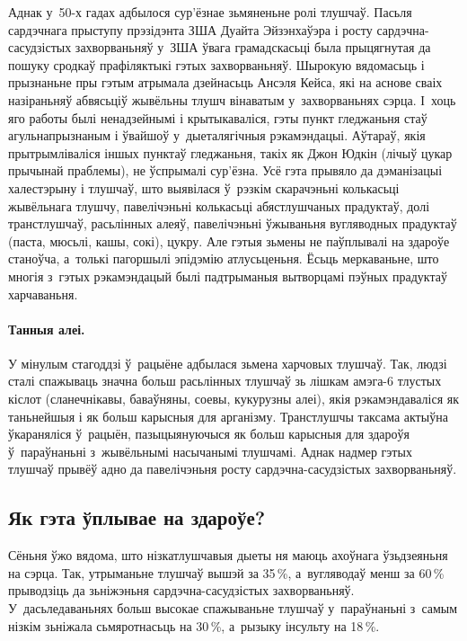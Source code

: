 Аднак у~50-х гадах адбылося сур'ёзнае зьмяненьне ролі тлушчаў. Пасьля сардэчнага прыступу прэзідэнта ЗША Дуайта Эйзэнхаўэра і росту сардэчна-сасудзістых захворваньняў у~ЗША ўвага грамадскасьці была прыцягнутая да пошуку сродкаў прафіляктыкі гэтых захворваньняў. Шырокую вядомасьць і прызнаньне пры гэтым атрымала дзейнасьць Ансэля Кейса, які на аснове сваіх назіраньняў абвясьціў жывёльны тлушч вінаватым у~захворваньнях сэрца. І~хоць яго работы былі ненадзейнымі і крытыкаваліся, гэты пункт гледжаньня стаў агульнапрызнаным і ўвайшоў у~дыеталягічныя рэкамэндацыі. Аўтараў, якія прытрымліваліся іншых пунктаў гледжаньня, такіх як Джон Юдкін (лічыў цукар прычынай праблемы), не ўспрымалі сур'ёзна. Усё гэта прывяло да дэманізацыі халестэрыну і тлушчаў, што выявілася ў~рэзкім скарачэньні колькасьці жывёльнага тлушчу, павелічэньні колькасьці абястлушчаных прадуктаў, долі транстлушчаў, расьлінных алеяў, павелічэньні ўжываньня вугляводных прадуктаў (паста, мюсьлі, кашы, сокі), цукру. Але гэтыя зьмены не паўплывалі на здароўе станоўча, а~толькі пагоршылі эпідэмію атлусьценьня. Ёсьць меркаваньне, што многія з~гэтых рэкамэндацый былі падтрыманыя вытворцамі пэўных прадуктаў харчаваньня.


\paragraph{Танныя алеі.}
У мінулым стагоддзі ў~рацыёне адбылася зьмена харчовых тлушчаў. Так, людзі сталі спажываць значна больш расьлінных тлушчаў зь лішкам амэга-6 тлустых кіслот (сланечнікавы, баваўняны, соевы, кукурузны алеі), якія рэкамэндаваліся як таньнейшыя і як больш карысныя для арганізму. Транстлушчы таксама актыўна ўкараняліся ў~рацыён, пазыцыянуючыся як больш карысныя для здароўя ў~параўнаньні з~жывёльнымі насычанымі тлушчамі. Аднак надмер гэтых тлушчаў прывёў адно да павелічэньня росту сардэчна-сасудзістых захворваньняў.

\subsection{Як гэта ўплывае на здароўе?}

Сёньня ўжо вядома, што нізкатлушчавыя дыеты ня маюць ахоўнага ўзьдзеяньня на сэрца. Так, утрыманьне тлушчаў вышэй за 35\,\%, а~вугляводаў менш за 60\,\% прыводзіць да зьніжэньня сардэчна-сасудзістых захворваньняў. У~дасьледаваньнях больш высокае спажываньне тлушчаў у~параўнаньні з~самым нізкім зьніжала сьмяротнасьць на 30\,\%, а~рызыку інсульту на 18\,\%.


